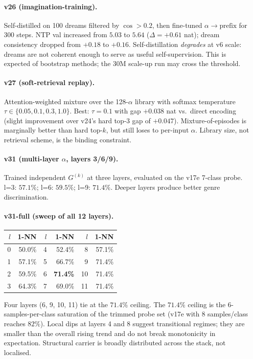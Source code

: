 \documentclass[11pt, a4paper]{article}
\theoremstyle{plain}
\theoremstyle{definition}
\theoremstyle{remark}
\begin{document}
\paragraph{v26 (imagination-training).}
Self-distilled on 100 dreams filtered by $\cos > 0.2$, then fine-tuned $\alpha \to \mathrm{prefix}$ for 300 steps.
NTP val increased from $5.03$ to $5.64$ ($\Delta = +0.61$ nat); dream consistency dropped from $+0.18$ to $+0.16$.
Self-distillation \emph{degrades} at v6 scale: dreams are not coherent enough to serve as useful self-supervision. This is expected of bootstrap methods; the 30M scale-up run may cross the threshold.

\paragraph{v27 (soft-retrieval replay).}
Attention-weighted mixture over the 128-$\alpha$ library with softmax temperature $\tau \in \{0.05, 0.1, 0.3, 1.0\}$.
Best: $\tau = 0.1$ with gap $+0.038$ nat vs.\ direct encoding (slight improvement over v24's hard top-3 gap of $+0.047$).
Mixture-of-episodes is marginally better than hard top-$k$, but still loses to per-input $\alpha$.
Library size, not retrieval scheme, is the binding constraint.

\paragraph{v31 (multi-layer $\alpha$, layers 3/6/9).}
Trained independent $G^{(k)}$ at three layers, evaluated on the v17e 7-class probe.
l=3: $57.1\%$; l=6: $59.5\%$; l=9: $71.4\%$.
Deeper layers produce better genre discrimination.

\paragraph{v31-full (sweep of all 12 layers).}
\begin{center}
\small
\begin{tabular}{rrrrrr}
\toprule
$l$ & 1-NN & $l$ & 1-NN & $l$ & 1-NN \\
\midrule
0 & 50.0\% & 4 & 52.4\% & 8  & 57.1\% \\
1 & 57.1\% & 5 & 66.7\% & 9  & 71.4\% \\
2 & 59.5\% & 6 & \textbf{71.4\%} & 10 & 71.4\% \\
3 & 64.3\% & 7 & 69.0\% & 11 & 71.4\% \\
\bottomrule
\end{tabular}
\end{center}
Four layers (6, 9, 10, 11) tie at the $71.4\%$ ceiling.
The $71.4\%$ ceiling is the 6-samples-per-class saturation of the trimmed probe set (v17e with 8 samples/class reaches $82\%$).
Local dips at layers 4 and 8 suggest transitional regimes; they are smaller than the overall rising trend and do not break monotonicity in expectation.
Structural carrier is broadly distributed across the stack, not localised.
\end{document}
